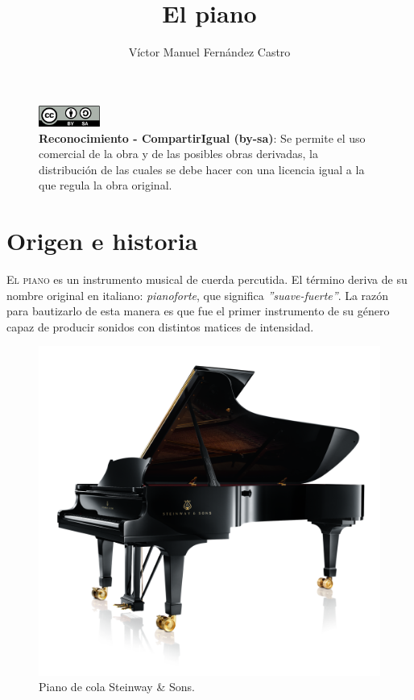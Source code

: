 \documentclass[10pt,a4paper]{article}
\title{El piano}
\author{Víctor Manuel Fernández Castro}
\begin{document}
	\maketitle
	\thispagestyle{empty}
	
	\begin{figure}[b]
		\centering
		\includegraphics[width=2cm]{images/by-sa}
		\caption*{\textbf{Reconocimiento - CompartirIgual (by-sa)}: Se permite 
		el uso comercial de la obra y de las posibles obras derivadas, la 
		distribución de las cuales se debe hacer con una licencia igual a la 
		que regula la obra original.}
	\end{figure}
	
	\newpage
	\tableofcontents
	\listoffigures
	
	
	\newpage
	\pagestyle{fancy}
	\section{Origen e historia}
	
	\lettrine{E}{l piano} es un instrumento musical de cuerda percutida. El 
	término deriva de su nombre original en italiano: \textit{pianoforte}, que  
	significa \textit{''suave-fuerte''}. La razón para bautizarlo de esta 
	manera es que fue el primer instrumento de su género capaz de producir 
	sonidos con distintos matices de intensidad.
	
	\begin{figure}[!ht]
		\includegraphics[width=\textwidth]{images/piano}
		\caption[Piano de cola]{\label{fig:piano} Piano de cola Steinway \& Sons. \cite{steinway}}
	\end{figure}
	
\end{document}
